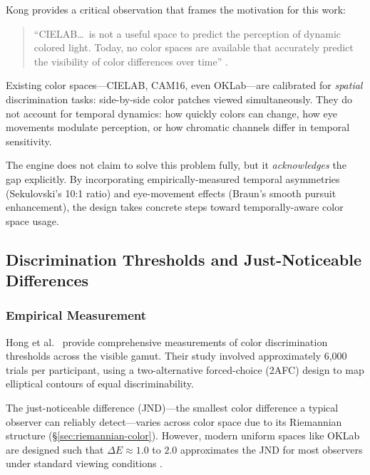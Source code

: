 Kong \citeyearpar{kong2021} provides a critical observation that frames the motivation for this work:

\begin{quote}
``CIELAB\ldots\ is not a useful space to predict the perception of dynamic colored light. Today, no color spaces are available that accurately predict the visibility of color differences over time'' \citep[p.~530]{kong2021}.
\end{quote}

Existing color spaces—CIELAB, CAM16, even OKLab—are calibrated for \emph{spatial} discrimination tasks: side-by-side color patches viewed simultaneously. They do not account for temporal dynamics: how quickly colors can change, how eye movements modulate perception, or how chromatic channels differ in temporal sensitivity.

The engine does not claim to solve this problem fully, but it \emph{acknowledges} the gap explicitly. By incorporating empirically-measured temporal asymmetries (Sekulovski's 10:1 ratio) and eye-movement effects (Braun's smooth pursuit enhancement), the design takes concrete steps toward temporally-aware color space usage.

\subsection{Discrimination Thresholds and Just-Noticeable Differences}
\label{sec:jnd-thresholds}

\subsubsection{Empirical Measurement}

Hong et al.\ \citeyearpar{hong2024} provide comprehensive measurements of color discrimination thresholds across the visible gamut. Their study involved approximately 6,000 trials per participant, using a two-alternative forced-choice (2AFC) design to map elliptical contours of equal discriminability.

The just-noticeable difference (JND)—the smallest color difference a typical observer can reliably detect—varies across color space due to its Riemannian structure (\S\ref{sec:riemannian-color}). However, modern uniform spaces like OKLab are designed such that $\Delta E \approx 1.0$ to $2.0$ approximates the JND for most observers under standard viewing conditions \citep{hong2024,ottosson2020}.

